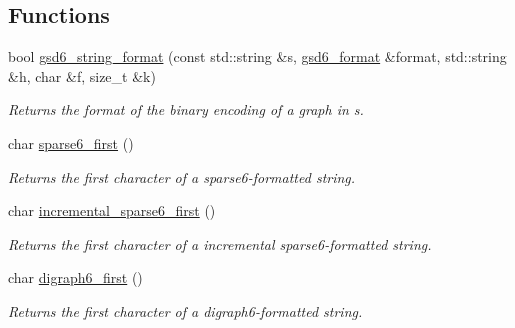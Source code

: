 \subsection*{Functions}
\begin{DoxyCompactItemize}
\item 
bool \hyperlink{namespacelgraph_1_1io_a555bafffaae99fce108ea5d4d58e365c}{gsd6\+\_\+string\+\_\+format} (const std\+::string \&s, \hyperlink{namespacelgraph_1_1io_ad0917668d35430ffe13d455d687be4ff}{gsd6\+\_\+format} \&format, std\+::string \&h, char \&f, size\+\_\+t \&k)
\begin{DoxyCompactList}\small\item\em Returns the format of the binary encoding of a graph in {\itshape s}. \end{DoxyCompactList}\item 
\mbox{\label{namespacelgraph_1_1io_a10e5665273589476194ba3a0864f27cc}} 
char \hyperlink{namespacelgraph_1_1io_a10e5665273589476194ba3a0864f27cc}{sparse6\+\_\+first} ()
\begin{DoxyCompactList}\small\item\em Returns the first character of a sparse6-\/formatted string. \end{DoxyCompactList}\item 
\mbox{\label{namespacelgraph_1_1io_a2933ba9e38c072aed5200245d4c910d4}} 
char \hyperlink{namespacelgraph_1_1io_a2933ba9e38c072aed5200245d4c910d4}{incremental\+\_\+sparse6\+\_\+first} ()
\begin{DoxyCompactList}\small\item\em Returns the first character of a incremental sparse6-\/formatted string. \end{DoxyCompactList}\item 
\mbox{\label{namespacelgraph_1_1io_a4e2ea6a030760d080c853942e107517f}} 
char \hyperlink{namespacelgraph_1_1io_a4e2ea6a030760d080c853942e107517f}{digraph6\+\_\+first} ()
\begin{DoxyCompactList}\small\item\em Returns the first character of a digraph6-\/formatted string. \end{DoxyCompactList}\item 
\mbox{\label{namespacelgraph_1_1io_a4395b0de6f762686c4d20e475f0e2b0f}} 

\end{DoxyCompactItemize}
